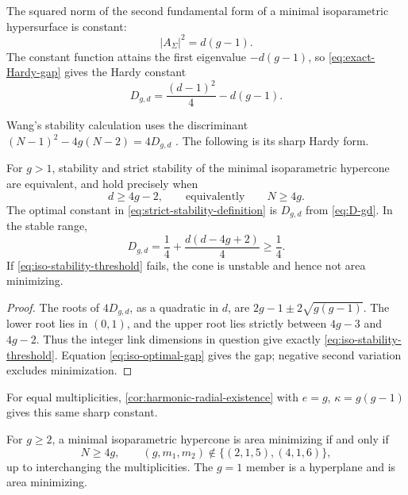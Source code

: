 The squared norm of the second fundamental form of a minimal
isoparametric hypersurface is constant:
\begin{equation}\label{eq:iso-A2}
 |A_\Sigma|^2=d(g-1).
\end{equation}
The constant function attains the first eigenvalue \(-d(g-1)\), so
\eqref{eq:exact-Hardy-gap} gives the Hardy constant
\begin{equation}\label{eq:D-gd}
 D_{g,d}=\frac{(d-1)^2}{4}-d(g-1).
\end{equation}

Wang's stability calculation uses the discriminant
\((N-1)^2-4g(N-2)=4D_{g,d}\)
\cite[Lemma~3.4, p.~216, and proof of Theorem~B, p.~238]{Wang94}.
The following is its sharp Hardy form.

\begin{proposition}
\label{prop:iso-stability}
For \(g>1\), stability and strict stability of the minimal isoparametric
hypercone are equivalent, and hold precisely when
\begin{equation}\label{eq:iso-stability-threshold}
 d\geq4g-2,\qquad\text{equivalently}\qquad N\geq4g.
\end{equation}
The optimal constant in \eqref{eq:strict-stability-definition} is
\(D_{g,d}\) from \eqref{eq:D-gd}.  In the stable range,
\begin{equation}\label{eq:iso-optimal-gap}
 D_{g,d}=\frac14+
       \frac{d(d-4g+2)}4\geq\frac14.
\end{equation}
If \eqref{eq:iso-stability-threshold} fails, the cone is unstable and hence
not area minimizing.
\end{proposition}

\begin{proof}
The roots of \(4D_{g,d}\), as a quadratic in \(d\), are
\(2g-1\pm2\sqrt{g(g-1)}\).  The lower root lies in \((0,1)\), and the upper
root lies strictly between \(4g-3\) and \(4g-2\).  Thus the integer link
dimensions in question give exactly \eqref{eq:iso-stability-threshold}.
Equation \eqref{eq:iso-optimal-gap} gives the gap; negative second
variation excludes minimization.
\end{proof}

For equal multiplicities, \cref{cor:harmonic-radial-existence}
with \(e=g\), \(\kappa=g(g-1)\) gives this same sharp constant.

\begin{theorem}
\label{thm:classical-iso-classification}
For \(g\geq2\), a minimal isoparametric hypercone is area minimizing if
and only if
\begin{equation}\label{eq:classical-iso-list}
 N\geq4g,
 \qquad
 (g,m_1,m_2)\notin\{(2,1,5),(4,1,6)\},
\end{equation}
up to interchanging the multiplicities.  The \(g=1\) member is a
hyperplane and is area minimizing.
\end{theorem}

